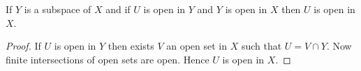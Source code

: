 \begin{lemma}
    If $Y$ is a subspace of $X$ and if $U$ is open in $Y$ and $Y$ is open in $X$ then $U$ is open in $X$.
\end{lemma}
\begin{proof}
    If $U$ is open in $Y$ then exists $V$ an open set in $X$ such that $U = V \cap Y$. Now finite intersections of open sets are open. Hence $U$ is open in $X$.
\end{proof}





